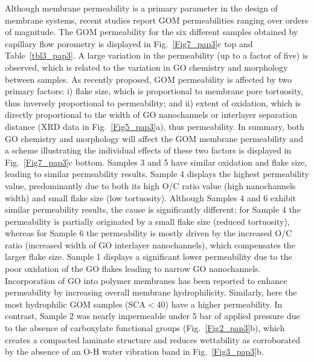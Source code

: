 Although membrane permeability is a primary parameter in the design of membrane systems, recent studies report GOM permeabilities ranging over orders of magnitude.\cite{amadei2016increase} The GOM permeability for the six different samples obtained by capillary flow porometry is displayed in Fig.~\ref{Fig7_pap3}c top and Table~\ref{tbl3_pap3}. A large variation in the permeability (up to a factor of five) is observed, which is related to the variation in GO chemistry and morphology between samples. As recently proposed, GOM permeability is affected by two primary factors:\cite{amadei2017role} i) flake size, which is proportional to membrane pore tortuosity, thus inversely proportional to permeability; and ii) extent of oxidation, which is directly proportional to the width of GO nanochannels or interlayer separation distance (XRD data in Fig.~\ref{Fig5_pap3}a), thus permeability. In summary, both GO chemistry and morphology will affect the GOM membrane permeability and a scheme illustrating the individual effects of these two factors is displayed in Fig.~\ref{Fig7_pap3}c bottom. Samples 3 and 5 have similar oxidation and flake size, leading to similar permeability results. Sample 4 displays the highest permeability value, predominantly due to both its high O/C ratio value (high nanochannels width) and small flake size (low tortuosity). Although Samples 4 and 6 exhibit similar permeability results, the cause is significantly different; for Sample 4 the permeability is partially originated by a small flake size (reduced tortuosity), whereas for Sample 6 the permeability is mostly driven by the increased O/C ratio (increased width of GO interlayer nanochannels), which compensates the larger flake size. Sample 1 displays a significant lower permeability due to the poor oxidation of the GO flakes leading to narrow GO nanochannels. Incorporation of GO into polymer membranes has been reported to enhance permeability by increasing overall membrane hydrophilicity.\cite{zinadini2014preparation} Similarly, here the most hydrophilic GOM samples (SCA$<40$\textdegree) have a higher permeability. In contrast, Sample 2 was nearly impermeable under 5 bar of applied pressure due to the absence of carboxylate functional groups (Fig.~\ref{Fig2_pap3}b), which creates a compacted laminate structure and reduces wettability as corroborated by the absence of an O-H water vibration band in Fig.~\ref{Fig3_pap3}b.
